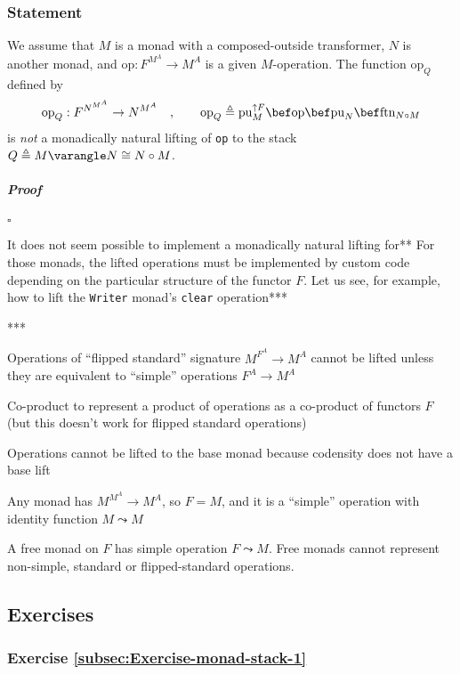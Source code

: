 \subsubsection{Statement}

We assume that $M$ is a monad with a composed-outside transformer,
$N$ is another monad, and $\text{op}:F^{M^{A}}\rightarrow M^{A}$
is a given $M$-operation. The function $\text{op}_{Q}$ defined by
\[
\text{op}_{Q}:F^{N^{M^{A}}}\rightarrow N^{M^{A}}\quad,\quad\quad\text{op}_{Q}\triangleq\text{pu}_{M}^{\uparrow F}\bef\text{op}\bef\text{pu}_{N}\bef\text{ftn}_{N\circ M}
\]
is \emph{not} a monadically natural lifting of \lstinline!op! to
the stack $Q\triangleq M\varangle N\cong N\circ M$.

\subparagraph{Proof}

$\square$

It does not seem possible to implement a monadically natural lifting
for{*}{*} For those monads, the lifted operations must be implemented
by custom code depending on the particular structure of the functor
$F$. Let us see, for example, how to lift the \lstinline!Writer!
monad\textsf{'}s \lstinline!clear! operation{*}{*}{*} 

{*}{*}{*}

Operations of \textsf{``}flipped standard\textsf{''} signature $M^{F^{A}}\rightarrow M^{A}$
cannot be lifted unless they are equivalent to \textsf{``}simple\textsf{''} operations
$F^{A}\rightarrow M^{A}$

Co-product to represent a product of operations as a co-product of
functors $F$ (but this doesn't work for flipped standard operations)

Operations cannot be lifted to the base monad because codensity does
not have a base lift

Any monad has $M^{M^{A}}\rightarrow M^{A}$, so $F=M$, and it is
a \textsf{``}simple\textsf{''} operation with identity function $M\leadsto M$

A free monad on $F$ has simple operation $F\leadsto M$. Free monads
cannot represent non-simple, standard or flipped-standard operations.

\subsection{Exercises}

\subsubsection{Exercise \label{subsec:Exercise-monad-stack-1}\ref{subsec:Exercise-monad-stack-1}}

